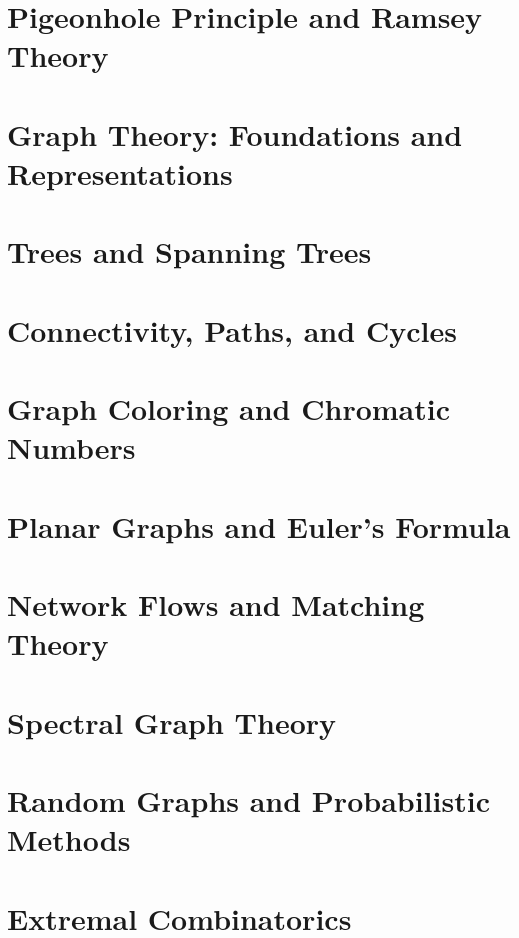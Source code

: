 \chapter{Pigeonhole Principle and Ramsey Theory}
\chapter{Graph Theory: Foundations and Representations}
\chapter{Trees and Spanning Trees}
\chapter{Connectivity, Paths, and Cycles}
\chapter{Graph Coloring and Chromatic Numbers}
\chapter{Planar Graphs and Euler's Formula}
\chapter{Network Flows and Matching Theory}
\chapter{Spectral Graph Theory}
\chapter{Random Graphs and Probabilistic Methods}
\chapter{Extremal Combinatorics}
